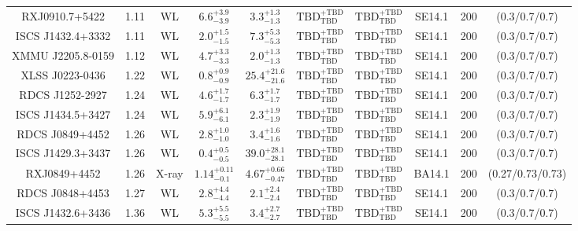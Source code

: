 \begin{table}
\begin{tabular}{cccccccccc}
RXJ0910.7+5422 & 1.11 & WL & ${6.6}^{+3.9}_{-3.9}$ & ${3.3}^{+1.3}_{-1.3}$ & ${\mathrm{TBD}}^{+\mathrm{TBD}}_{\mathrm{TBD}}$ & ${\mathrm{TBD}}^{+\mathrm{TBD}}_{\mathrm{TBD}}$ & SE14.1 & 200 & (0.3/0.7/0.7) \\
ISCS J1432.4+3332 & 1.11 & WL & ${2.0}^{+1.5}_{-1.5}$ & ${7.3}^{+5.3}_{-5.3}$ & ${\mathrm{TBD}}^{+\mathrm{TBD}}_{\mathrm{TBD}}$ & ${\mathrm{TBD}}^{+\mathrm{TBD}}_{\mathrm{TBD}}$ & SE14.1 & 200 & (0.3/0.7/0.7) \\
XMMU J2205.8-0159 & 1.12 & WL & ${4.7}^{+3.3}_{-3.3}$ & ${2.0}^{+1.3}_{-1.3}$ & ${\mathrm{TBD}}^{+\mathrm{TBD}}_{\mathrm{TBD}}$ & ${\mathrm{TBD}}^{+\mathrm{TBD}}_{\mathrm{TBD}}$ & SE14.1 & 200 & (0.3/0.7/0.7) \\
XLSS J0223-0436 & 1.22 & WL & ${0.8}^{+0.9}_{-0.9}$ & ${25.4}^{+21.6}_{-21.6}$ & ${\mathrm{TBD}}^{+\mathrm{TBD}}_{\mathrm{TBD}}$ & ${\mathrm{TBD}}^{+\mathrm{TBD}}_{\mathrm{TBD}}$ & SE14.1 & 200 & (0.3/0.7/0.7) \\
RDCS J1252-2927 & 1.24 & WL & ${4.6}^{+1.7}_{-1.7}$ & ${6.3}^{+1.7}_{-1.7}$ & ${\mathrm{TBD}}^{+\mathrm{TBD}}_{\mathrm{TBD}}$ & ${\mathrm{TBD}}^{+\mathrm{TBD}}_{\mathrm{TBD}}$ & SE14.1 & 200 & (0.3/0.7/0.7) \\
ISCS J1434.5+3427 & 1.24 & WL & ${5.9}^{+6.1}_{-6.1}$ & ${2.3}^{+1.9}_{-1.9}$ & ${\mathrm{TBD}}^{+\mathrm{TBD}}_{\mathrm{TBD}}$ & ${\mathrm{TBD}}^{+\mathrm{TBD}}_{\mathrm{TBD}}$ & SE14.1 & 200 & (0.3/0.7/0.7) \\
RDCS J0849+4452 & 1.26 & WL & ${2.8}^{+1.0}_{-1.0}$ & ${3.4}^{+1.6}_{-1.6}$ & ${\mathrm{TBD}}^{+\mathrm{TBD}}_{\mathrm{TBD}}$ & ${\mathrm{TBD}}^{+\mathrm{TBD}}_{\mathrm{TBD}}$ & SE14.1 & 200 & (0.3/0.7/0.7) \\
ISCS J1429.3+3437 & 1.26 & WL & ${0.4}^{+0.5}_{-0.5}$ & ${39.0}^{+28.1}_{-28.1}$ & ${\mathrm{TBD}}^{+\mathrm{TBD}}_{\mathrm{TBD}}$ & ${\mathrm{TBD}}^{+\mathrm{TBD}}_{\mathrm{TBD}}$ & SE14.1 & 200 & (0.3/0.7/0.7) \\
RXJ0849+4452 & 1.26 & X-ray & ${1.14}^{+0.11}_{-0.1}$ & ${4.67}^{+0.66}_{-0.47}$ & ${\mathrm{TBD}}^{+\mathrm{TBD}}_{\mathrm{TBD}}$ & ${\mathrm{TBD}}^{+\mathrm{TBD}}_{\mathrm{TBD}}$ & BA14.1 & 200 & (0.27/0.73/0.73) \\
RDCS J0848+4453 & 1.27 & WL & ${2.8}^{+4.4}_{-4.4}$ & ${2.1}^{+2.4}_{-2.4}$ & ${\mathrm{TBD}}^{+\mathrm{TBD}}_{\mathrm{TBD}}$ & ${\mathrm{TBD}}^{+\mathrm{TBD}}_{\mathrm{TBD}}$ & SE14.1 & 200 & (0.3/0.7/0.7) \\
ISCS J1432.6+3436 & 1.36 & WL & ${5.3}^{+5.5}_{-5.5}$ & ${3.4}^{+2.7}_{-2.7}$ & ${\mathrm{TBD}}^{+\mathrm{TBD}}_{\mathrm{TBD}}$ & ${\mathrm{TBD}}^{+\mathrm{TBD}}_{\mathrm{TBD}}$ & SE14.1 & 200 & (0.3/0.7/0.7) \\

\end{tabular}
\end{table}
